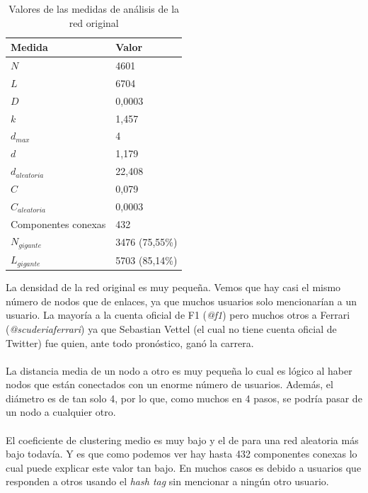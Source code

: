 \begin{table}[H]
	\centering
	\caption{Valores de las medidas de análisis de la red original}
	\label{tab:medidas-original}
	\begin{tabular}{| l | l |}
		\hline
		Medida                & Valor          \\ 
		\hline
		$N$                   & 4601           \\
		$L$                   & 6704           \\
		$D$                   & 0,0003         \\
		$k$                   & 1,457          \\
		$d_{max}$             & 4              \\
		$d$                   & 1,179          \\
		$d_{aleatoria}$       & 22,408         \\
		$C$                   & 0,079          \\
		$C_{aleatoria}$       & 0,0003         \\
		Componentes conexas   & 432            \\ 
		$N_{gigante}$         & 3476 (75,55\%) \\ 
		$L_{gigante}$         & 5703 (85,14\%) \\ 
		\hline
	\end{tabular}
\end{table}

La densidad de la red original es muy pequeña. Vemos que hay casi el mismo número de nodos que de enlaces, ya que muchos usuarios solo mencionarían a un usuario. La mayoría a la cuenta oficial de F1 (\textit{@f1}) pero muchos otros a Ferrari (\textit{@scuderiaferrari}) ya que Sebastian Vettel (el cual no tiene cuenta oficial de Twitter) fue quien, ante todo pronóstico, ganó la carrera.
\\ \\
La distancia media de un nodo a otro es muy pequeña lo cual es lógico al haber nodos que están conectados con un enorme número de usuarios. Además, el diámetro es de tan solo 4, por lo que, como muchos en 4 pasos, se podría pasar de un nodo a cualquier otro.
\\ \\
El coeficiente de clustering medio es muy bajo y el de para una red aleatoria más bajo todavía. Y es que como podemos ver hay hasta 432 componentes conexas lo cual puede explicar este valor tan bajo. En muchos casos es debido a usuarios que responden a otros usando el \textit{hash tag} sin mencionar a ningún otro usuario.

